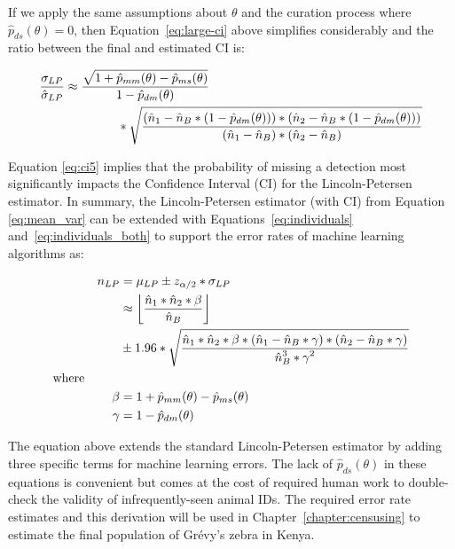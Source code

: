 \newpage

\noindent If we apply the same assumptions about $\theta$ and the curation process where $\hat{p}_{ds}(\theta) = 0$, then Equation~\eqref{eq:large-ci} above simplifies considerably and the ratio between the final and estimated CI is:

\begin{align} \label{eq:ci5}
    \begin{split}
        \frac{\displaystyle \sigma_{LP}}{\displaystyle \hat{\sigma}_{LP}} &\approx \frac{\displaystyle \sqrt{1 + \hat{p}_{mm}(\theta) - \hat{p}_{ms}(\theta)}}{\displaystyle 1 - \hat{p}_{dm}(\theta)} \\
        & \hspace{1.5cm} * \sqrt{\frac{\displaystyle (\hat{n}_{1} - \hat{n}_{B} * (1 - \hat{p}_{dm}(\theta))) * (\hat{n}_{2} - \hat{n}_{B} * (1 - \hat{p}_{dm}(\theta)))}{\displaystyle (\hat{n}_{1} - \hat{n}_{B})*(\hat{n}_{2} - \hat{n}_{B})}}
    \end{split}
\end{align}

\noindent Equation \eqref{eq:ci5} implies that the probability of missing a detection most significantly impacts the Confidence Interval (CI) for the Lincoln-Petersen estimator.  In summary, the Lincoln-Petersen estimator (with CI) from Equation \eqref{eq:mean_var} can be extended with Equations~\eqref{eq:individuals} and~\eqref{eq:individuals_both} to support the error rates of machine learning algorithms as:

\begin{align} \label{eq:final}
    \begin{split}
        n_{LP} &= \mu_{LP} \pm z_{\alpha/2} * \sigma_{LP} \\
        &\approx \left\lfloor \frac{\displaystyle \hat{n}_{1} * \hat{n}_{2} * \beta}{\displaystyle \hat{n}_{B}} \right\rfloor \\
        & \hspace{0cm} \pm 1.96 * \sqrt{\frac{\displaystyle \hat{n}_{1} * \hat{n}_{2} * \beta * (\hat{n}_{1} - \hat{n}_{B} * \gamma) * (\hat{n}_{2} - \hat{n}_{B} * \gamma)}{\displaystyle \hat{n}_{B}^3 * \gamma^2}} \\
        \text{where} \hspace{1cm} & \\
        \beta &= 1 + \hat{p}_{mm}(\theta) - \hat{p}_{ms}(\theta) \\
        \gamma &= 1 - \hat{p}_{dm}(\theta)
    \end{split}
\end{align}

\noindent  The equation above extends the standard Lincoln-Petersen estimator by adding three specific terms for machine learning errors.  The lack of $\hat{p}_{ds}(\theta)$ in these equations is convenient but comes at the cost of required human work to double-check the validity of infrequently-seen animal IDs.  The required error rate estimates and this derivation will be used in Chapter~\ref{chapter:censusing} to estimate the final population of Gr\'evy's zebra in Kenya.

